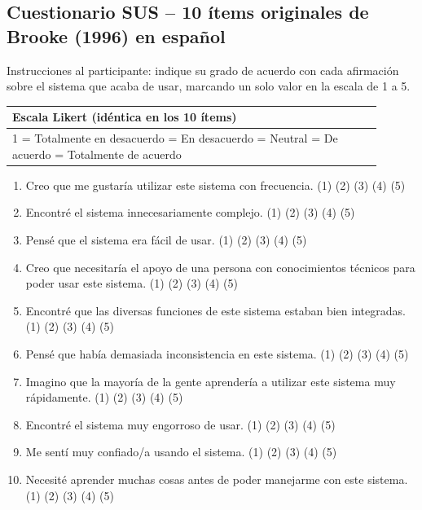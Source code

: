 \subsection{Cuestionario SUS -- 10 ítems originales de Brooke (1996) en español}

Instrucciones al participante: indique su grado de acuerdo con cada
afirmación sobre el sistema que acaba de usar, marcando un solo valor
en la escala de 1 a 5.

\begin{center}
\small
\begin{tabular}{@{}p{0.9\linewidth}@{}}
\toprule
\textbf{Escala Likert (idéntica en los 10 ítems)} \\
\midrule
1 = Totalmente en desacuerdo \quad
2 = En desacuerdo \quad
3 = Neutral \quad
4 = De acuerdo \quad
5 = Totalmente de acuerdo \\
\bottomrule
\end{tabular}
\end{center}

\begin{enumerate}[leftmargin=1.2cm]
  \item Creo que me gustaría utilizar este sistema con frecuencia.
        \hfill (1) (2) (3) (4) (5)
  \item Encontré el sistema innecesariamente complejo.
        \hfill (1) (2) (3) (4) (5)
  \item Pensé que el sistema era fácil de usar.
        \hfill (1) (2) (3) (4) (5)
  \item Creo que necesitaría el apoyo de una persona con conocimientos
        técnicos para poder usar este sistema.
        \hfill (1) (2) (3) (4) (5)
  \item Encontré que las diversas funciones de este sistema estaban
        bien integradas.
        \hfill (1) (2) (3) (4) (5)
  \item Pensé que había demasiada inconsistencia en este sistema.
        \hfill (1) (2) (3) (4) (5)
  \item Imagino que la mayoría de la gente aprendería a utilizar este
        sistema muy rápidamente.
        \hfill (1) (2) (3) (4) (5)
  \item Encontré el sistema muy engorroso de usar.
        \hfill (1) (2) (3) (4) (5)
  \item Me sentí muy confiado/a usando el sistema.
        \hfill (1) (2) (3) (4) (5)
  \item Necesité aprender muchas cosas antes de poder manejarme con
        este sistema.
        \hfill (1) (2) (3) (4) (5)
\end{enumerate}

